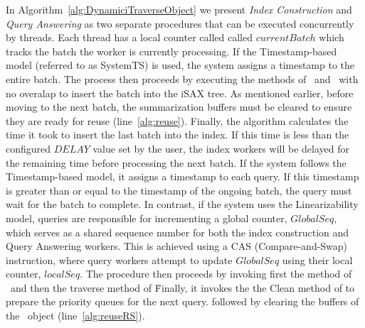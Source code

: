 In Algorithm~\ref{alg:DynamiciTraverseObject} we present 
\textit{Index Construction} and \textit{Query Answering} as two separate procedures that can
be executed concurrently by threads. 
\newline {}Each thread has a local counter called
called $currentBatch$ which tracks the batch the worker is currently processing.
If the Timestamp-based model (referred to as SystemTS) is used, the system assigns a
timestamp to the entire batch. The process then proceeds by executing the \Traverse methods 
of \BC\ and \TP\ with no overalap to insert the batch into the iSAX tree.
% 
As mentioned earlier, before moving to the next batch, the summarization buffers must
be cleared to ensure they are ready for reuse (line~\ref{alg:reuse}).
Finally, the algorithm calculates the time it took to insert the last batch
into the index. If this time is less than the configured $DELAY$ value set by the user,
the index workers will be delayed for the remaining time before processing the next batch.
% 
\newline {} 
If the system follows the Timestamp-based model, it assigns a
timestamp to each query. If this timestamp is greater than or equal to the timestamp
of the ongoing batch, the query must wait for the batch to complete.
In contrast, if the system uses the Linearizability model,
queries are responsible for incrementing a global counter, $GlobalSeq$, which serves
as a shared sequence number for both the index construction and Query Answering workers.
This is achieved using a CAS (Compare-and-Swap) instruction, where query workers attempt
to update $GlobalSeq$ using their local counter, $localSeq$. The procedure then proceeds by
invoking first the \Traverse method of \PS\ and then the traverse method of \RS\. Finally,
it invokes the the Clean method of \RS to prepare the priority queues for the next query.
followed by clearing the buffers of the \RS\ object (line~\ref{alg:reuseRS}).

